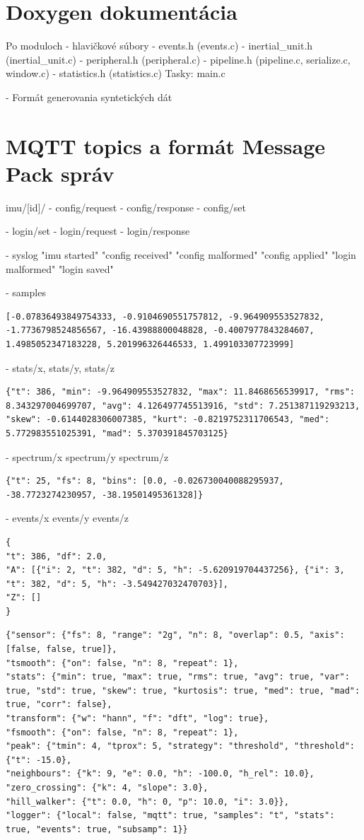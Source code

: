 \section{Doxygen dokumentácia}
Po moduloch - hlavičkové súbory
- events.h  (events.c)
- inertial\_unit.h (inertial\_unit.c)
- peripheral.h  (peripheral.c)
- pipeline.h (pipeline.c, serialize.c, window.c)
- statistics.h (statistics.c)
Tasky: main.c

- Formát generovania syntetických dát

\section{MQTT topics a formát Message Pack správ}
imu/[id]/
- config/request
- config/response
- config/set

- login/set
- login/request
- login/response

- syslog
	"imu started"
	"config received"
	"config malformed"
	"config applied"
	"login malformed"
	"login saved"

- samples
\begin{verbatim}
[-0.07836493849754333, -0.9104690551757812, -9.964909553527832, -1.7736798524856567, -16.43988800048828, -0.4007977843284607, 1.4985052347183228, 5.201996326446533, 1.499103307723999]
\end{verbatim}

- stats/x, stats/y, stats/z
\begin{verbatim}
{"t": 386, "min": -9.964909553527832, "max": 11.8468656539917, "rms": 8.343297004699707, "avg": 4.126497745513916, "std": 7.251387119293213, "skew": -0.6144028306007385, "kurt": -0.8219752311706543, "med": 5.772983551025391, "mad": 5.370391845703125}
\end{verbatim}

- spectrum/x spectrum/y  spectrum/z
\begin{verbatim}
{"t": 25, "fs": 8, "bins": [0.0, -0.026730040088295937, -38.7723274230957, -38.19501495361328]}
\end{verbatim}

- events/x events/y events/z
\begin{verbatim}
{
"t": 386, "df": 2.0,
"A": [{"i": 2, "t": 382, "d": 5, "h": -5.620919704437256}, {"i": 3, "t": 382, "d": 5, "h": -3.549427032470703}],
"Z": []
}
\end{verbatim}

\begin{verbatim}
{"sensor": {"fs": 8, "range": "2g", "n": 8, "overlap": 0.5, "axis": [false, false, true]},
"tsmooth": {"on": false, "n": 8, "repeat": 1},
"stats": {"min": true, "max": true, "rms": true, "avg": true, "var": true, "std": true, "skew": true, "kurtosis": true, "med": true, "mad": true, "corr": false},
"transform": {"w": "hann", "f": "dft", "log": true},
"fsmooth": {"on": false, "n": 8, "repeat": 1},
"peak": {"tmin": 4, "tprox": 5, "strategy": "threshold", "threshold": {"t": -15.0},
"neighbours": {"k": 9, "e": 0.0, "h": -100.0, "h_rel": 10.0},
"zero_crossing": {"k": 4, "slope": 3.0},
"hill_walker": {"t": 0.0, "h": 0, "p": 10.0, "i": 3.0}},
"logger": {"local": false, "mqtt": true, "samples": "t", "stats": true, "events": true, "subsamp": 1}}
\end{verbatim}

